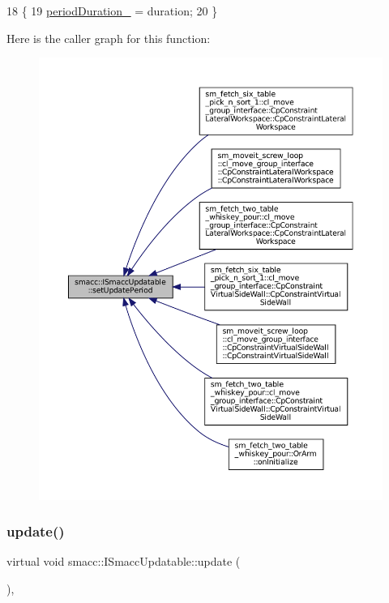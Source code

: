\begin{DoxyCode}
18 \{
19     \hyperlink{classsmacc_1_1ISmaccUpdatable_ad02d9798ac5609f3ecb9fb8a46febc18}{periodDuration\_} = duration;
20 \}
\end{DoxyCode}
Here is the caller graph for this function\+:
\nopagebreak
\begin{figure}[H]
\begin{center}
\leavevmode
\includegraphics[width=350pt]{classsmacc_1_1ISmaccUpdatable_a88f3b092a81b2d8810a9776c8c69855b_icgraph}
\end{center}
\end{figure}
\mbox{\label{classsmacc_1_1ISmaccUpdatable_a84ee0520cbefdb1d412bed54650b028e}} 
\subsubsection{\texorpdfstring{update()}{update()}}
{\footnotesize\ttfamily virtual void smacc\+::\+I\+Smacc\+Updatable\+::update (\begin{DoxyParamCaption}{ }\end{DoxyParamCaption})\hspace{0.3cm}{\ttfamily [protected]}, {}}



